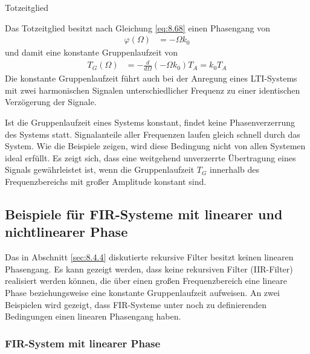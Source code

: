 \begin{example}{Totzeitglied}
\label{example:beispiel-totzeitglied}

Das Totzeitglied besitzt nach Gleichung \eqref{eq:8.68} einen Phasengang von
\begin{align*}
\varphi(\Omega) &= - \Omega  k_{0} 
\end{align*}
und damit eine konstante Gruppenlaufzeit von
\begin{align*}
T_{G}(\Omega) &= - \frac{d}{d\Omega}\left( - \Omega  k_{0} \right)  T_{A} = k_{0}  T_{A} 
\end{align*}
Die konstante Gruppenlaufzeit führt auch bei der Anregung eines LTI-Systems mit zwei harmonischen Signalen unterschiedlicher Frequenz zu einer identischen Verzögerung der Signale.

\end{example}

Ist die Gruppenlaufzeit eines Systems konstant, findet keine Phasenverzerrung des Systems statt. Signalanteile aller Frequenzen laufen gleich schnell durch das System. Wie die Beispiele zeigen, wird diese Bedingung nicht von allen Systemen ideal erfüllt. Es zeigt sich, dass eine weitgehend unverzerrte Übertragung eines Signals gewährleistet ist, wenn die Gruppenlaufzeit \(T_{G}\) innerhalb des Frequenzbereichs mit großer Amplitude konstant sind.

\subsection{Beispiele für FIR-Systeme mit linearer und nichtlinearer Phase}\label{sec:8.4.5}

Das in Abschnitt \ref{sec:8.4.4} diskutierte rekursive Filter besitzt keinen linearen Phasengang. Es kann gezeigt werden, dass keine rekursiven Filter (IIR-Filter) realisiert werden können, die über einen großen Frequenzbereich eine lineare Phase beziehungsweise eine konstante Gruppenlaufzeit aufweisen. An zwei Beispielen wird gezeigt, dass FIR-Systeme unter noch zu definierenden Bedingungen einen linearen Phasengang haben.

\subsubsection{FIR-System mit linearer Phase}\label{sec:fir-system-mit-linearer-phase}


